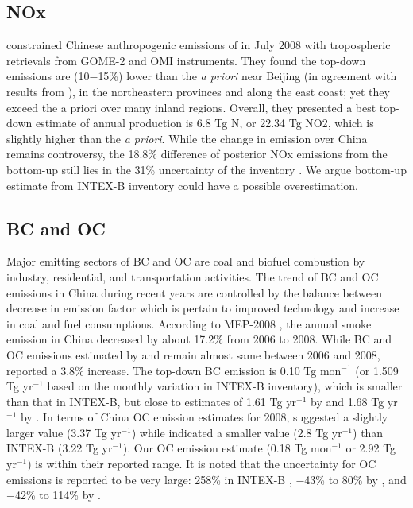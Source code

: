  \subsection{NOx} 

  \citet{lin10} constrained Chinese anthropogenic emissions of  in July 2008 with tropospheric  retrievals from GOME-2 and OMI instruments.
They found the top-down emissions are (10$-$15\%) lower than the \textit{a priori} near Beijing (in agreement with results from \citet{Mijling09}),
in the northeastern provinces and along the east coast; yet they exceed the a priori over many inland regions. 
Overall, they presented a best top-down estimate of annual  production is 6.8 Tg N, or 22.34 Tg NO2, which is slightly higher than the \textit{a priori}. 
While the change in  emission over China remains controversy, the 18.8\% difference of posterior NOx emissions from the bottom-up still lies in the 31\% uncertainty of the inventory \citep{zhang09b}.
We argue bottom-up  estimate from INTEX-B inventory could have a possible overestimation.   

 \subsection{BC and OC}  

  Major emitting sectors of BC and OC are coal and biofuel combustion by industry, residential, and transportation activities. 
The trend of BC and OC emissions in China during recent years are controlled by the balance between decrease in emission factor which is pertain to improved technology and increase in coal and fuel consumptions. 
According to MEP-2008 \citep{mep09}, the annual smoke emission in China decreased by about 17.2\% from 2006 to 2008. 
While BC and OC emissions estimated by \citet{lu11} and \citet{zhao13} remain almost same between 2006 and 2008, \citet{qin12} reported a 3.8\% increase. 
The top-down BC emission is 0.10 Tg mon$^{-1}$ (or 1.509 Tg yr$^{-1}$ based on the monthly variation in INTEX-B inventory), which is smaller than that in INTEX-B, but close to estimates of 1.61 Tg yr$^{-1}$ by \citet{qin12} and 1.68 Tg yr$^{-1}$ by \citet{lu11}. 
In terms of China OC emission estimates for 2008, \citet{lu11} suggested a slightly larger value (3.37 Tg yr$^{-1}$) while \citet{zhao13} indicated a smaller value (2.8 Tg yr$^{-1}$) than INTEX-B (3.22 Tg yr$^{-1}$).  
Our OC emission estimate (0.18 Tg mon$^{-1}$ or 2.92 Tg yr$^{-1}$) is within their reported range. 
It is noted that the uncertainty for OC emissions is reported to be very large: 258\% in INTEX-B \citep{zhang09b}, $-$43\% to 80\% by \citet{lu11}, and $-$42\% to 114\% by \citet{zhao13}.

